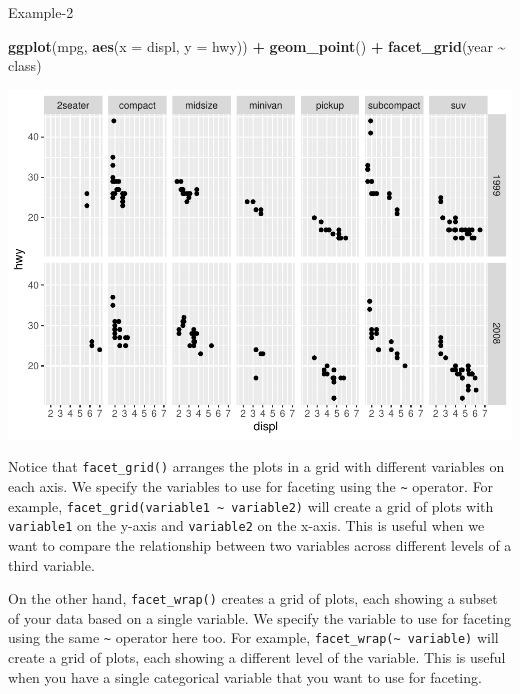 \documentclass[
]{book}
\newenvironment{Shaded}{\begin{snugshade}}{\end{snugshade}}
\newcommand{\AttributeTok}[1]{\textcolor[rgb]{0.13,0.29,0.53}{#1}}
\newcommand{\FunctionTok}[1]{\textcolor[rgb]{0.13,0.29,0.53}{\textbf{#1}}}
\newcommand{\NormalTok}[1]{#1}
\newcommand{\SpecialCharTok}[1]{\textcolor[rgb]{0.81,0.36,0.00}{\textbf{#1}}}
\begin{document}
Example-2

\begin{Shaded}
\begin{Highlighting}[]
\FunctionTok{ggplot}\NormalTok{(mpg, }\FunctionTok{aes}\NormalTok{(}\AttributeTok{x =}\NormalTok{ displ, }\AttributeTok{y =}\NormalTok{ hwy)) }\SpecialCharTok{+} 
  \FunctionTok{geom\_point}\NormalTok{() }\SpecialCharTok{+} 
  \FunctionTok{facet\_grid}\NormalTok{(year }\SpecialCharTok{\textasciitilde{}}\NormalTok{ class)}
\end{Highlighting}
\end{Shaded}

\includegraphics{DauR_files/figure-latex/unnamed-chunk-211-1.pdf}

Notice that \texttt{facet\_grid()} arranges the plots in a grid with different variables on each axis. We specify the variables to use for faceting using the \texttt{\textasciitilde{}} operator. For example, \texttt{facet\_grid(variable1\ \textasciitilde{}\ variable2)} will create a grid of plots with \texttt{variable1} on the y-axis and \texttt{variable2} on the x-axis. This is useful when we want to compare the relationship between two variables across different levels of a third variable.

On the other hand, \texttt{facet\_wrap()} creates a grid of plots, each showing a subset of your data based on a single variable. We specify the variable to use for faceting using the same \texttt{\textasciitilde{}} operator here too. For example, \texttt{facet\_wrap(\textasciitilde{}\ variable)} will create a grid of plots, each showing a different level of the variable. This is useful when you have a single categorical variable that you want to use for faceting.
\end{document}
